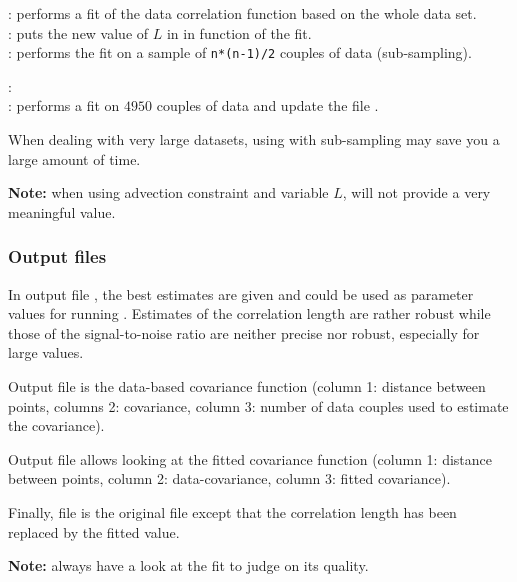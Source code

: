  \qquad: performs a fit of the data correlation function based on the whole data set. \\
 \qquad: puts the new value of $L$ in  in function of the fit.\\
 \qquad: performs the fit on a sample of \texttt{n*(n-1)/2} couples of data (sub-sampling). 

\examples:\\
: performs a fit on $4950$ couples of data and update the file .

\btips
When dealing with very large datasets, using  with sub-sampling may save you a large amount of time.
\etips

\textbf{Note:} when using advection constraint and variable $L$,  will not provide a very meaningful value.

\subsubsection{Output files}

In output file , the best estimates are given and could be used as parameter values for running \diva.
Estimates of the correlation length are rather robust while those of the signal-to-noise ratio are neither precise nor robust, especially for large values.

Output file  is the data-based covariance function (column 1: distance between points, columns 2: covariance, column 3: number of data couples used to estimate the covariance). 

Output file  allows looking at the fitted covariance function (column 1: distance between points, 
column 2: data-covariance, column 3: fitted covariance).

Finally, file  is the original  file except that the correlation length has been replaced by the fitted value. 

\textbf{Note:} always have a look at the fit to judge on its quality. %

\subsection{}

